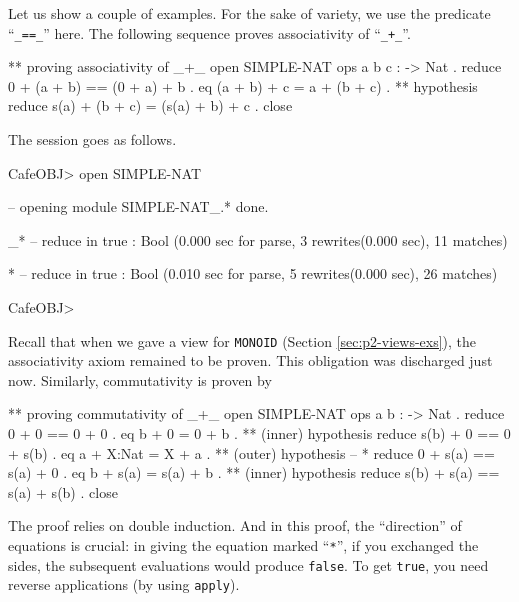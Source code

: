 \documentclass[a4paper]{memoir}
\begin{document}
Let us show a couple of examples. For the sake of variety, we use
the predicate ``\verb|_==_|'' here. The following sequence proves
associativity of ``\verb|_+_|''.
\begin{vvtm}
\begin{ccode}
  ** proving associativity of _+_
  open SIMPLE-NAT
  ops a b c : -> Nat .
  reduce 0 + (a + b) == (0 + a) + b .
  eq (a + b) + c = a + (b + c) . ** hypothesis
  reduce s(a) + (b + c) = (s(a) + b) + c .
  close
\end{ccode}
\end{vvtm}
The session goes as follows.
\begin{vvtm}
\begin{ccode}
  CafeOBJ> open SIMPLE-NAT

  -- opening module SIMPLE-NAT_.* done.


  _*
  -- reduce in %
  true : Bool
  (0.000 sec for parse, 3 rewrites(0.000 sec), 11 matches)

  *
  -- reduce in %
  true : Bool
  (0.010 sec for parse, 5 rewrites(0.000 sec), 26 matches)


  CafeOBJ> 
\end{ccode}
\end{vvtm}
Recall that when we gave a view for \verb|MONOID|
(Section \ref{sec:p2-views-exs}), the associativity axiom
remained to be proven. This obligation was discharged just now.
Similarly, commutativity is proven by
\begin{vvtm}
\begin{ccode}
  ** proving commutativity of _+_
  open SIMPLE-NAT
  ops a b : -> Nat .
  reduce 0 + 0 == 0 + 0 .
  eq b + 0 = 0 + b . ** (inner) hypothesis
  reduce s(b) + 0 == 0 + s(b) .
  eq a + X:Nat = X + a . ** (outer) hypothesis -- *
  reduce 0 + s(a) == s(a) + 0 .
  eq b + s(a) = s(a) + b . ** (inner) hypothesis
  reduce s(b) + s(a) == s(a) + s(b) .
  close
\end{ccode}
\end{vvtm}
The proof relies on double induction. And in this proof,
the ``direction'' of equations is crucial: in giving the equation
marked ``\verb|*|'', if you exchanged the sides, the subsequent evaluations
would produce \verb|false|. To get \verb|true|, you need
reverse applications (by using \verb|apply|).
\end{document}
